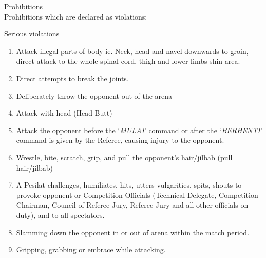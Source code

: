 \begin{legal}
\begin{legal}
    \item Prohibitions \\
    Prohibitions which are declared as violations:
        \begin{legal}
        \item Serious violations
            \begin{enumerate}[label=\alph*.]
            \item Attack illegal parts of body ie. Neck, head and navel downwards to groin,
            direct attack to the whole spinal cord, thigh and lower limbs shin area.
            \item Direct attempts to break the joints.
            \item Deliberately throw the opponent out of the arena
            \item Attack with head (Head Butt)
            \item Attack the opponent before the `\emph{MULAI}' command or after the `\emph{BERHENTI}'
            command is given by the Referee, causing injury to the opponent.
            \item Wrestle, bite, scratch, grip, and pull the opponent’s hair/jilbab (pull hair/jilbab)
            \item A Pesilat challenges, humiliates, hits, utters vulgarities, spits, shouts to
                  provoke opponent or Competition Officials (Technical Delegate,
                  Competition Chairman, Council of Referee-Jury, Referee-Jury and all other
                  officials on duty), and to all spectators.
            \item Slamming down the opponent in or out of arena within the match period.
            \item Gripping, grabbing or embrace while attacking.
            \end{enumerate}


\end{legal}
\end{legal}
\end{legal}
